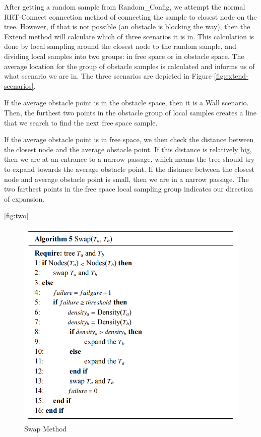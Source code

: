 \documentclass[conference]{IEEEtran}
\begin{document}
After getting a random sample from Random\_Config, we attempt the normal RRT-Connect connection method of connecting the sample to closest node on the tree. However, if that is not possible (an obstacle is blocking the way), then the Extend method will calculate which of three scenarios it is in. This calculation is done by local sampling around the closest node to the random sample, and dividing local samples into two groups: in free space or in obstacle space. The average location for the group of obstacle samples is calculated and informs us of what scenario we are in. The three scenarios are depicted in Figure \ref{fig:extend-scenarios}.

If the average obstacle point is in the obstacle space, then it is a Wall scenario. Then, the furthest two points in the obstacle group of local samples creates a line that we search to find the next free space sample.

If the average obstacle point is in free space, we then check the distance between the closest node and the average obstacle point. If this distance is relatively big, then we are at an entrance to a narrow passage, which means the tree should try to expand towards the average obstacle point. If the distance between the closest node and average obstacle point is small, then we are in a narrow passage. The two farthest points in the free space local sampling group indicates our direction of expansion. 

\ref{fig:two}


\begin{figure}[!t]
  \centering
  \includegraphics[width=\linewidth]{algorithm5}  %
  \caption{Swap Method}
  \label{fig:one}
\end{figure}
\end{document}
